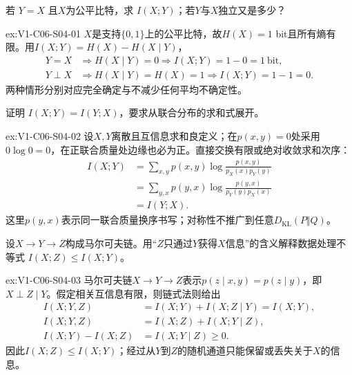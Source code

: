 \begin{SLChapterExercisePairSection}
\begin{exercise}\label{ex:V1-C06-S04-01}
若 $Y=X$ 且$X$为公平比特，求 $I(X;Y)$；若$Y$与$X$独立又是多少？
\end{exercise}
\label{sol:V1-C06-S04-01}
\begin{chapterexercisesolution}{ex:V1-C06-S04-01}
$X$是支持$\{0,1\}$上的公平比特，故$H(X)=1$ bit且所有熵有限。用$I(X;Y)=H(X)-H(X\mid Y)$，
\[
\begin{aligned}
Y=X&\Longrightarrow H(X\mid Y)=0
\Longrightarrow I(X;Y)=1-0=1\ \text{bit},\\
Y\perp X&\Longrightarrow H(X\mid Y)=H(X)=1
\Longrightarrow I(X;Y)=1-1=0.
\end{aligned}
\]
两种情形分别对应完全确定与不减少任何平均不确定性。
\end{chapterexercisesolution}

\begin{exercise}\label{ex:V1-C06-S04-02}
证明 $I(X;Y)=I(Y;X)$，要求从联合分布的求和式展开。
\end{exercise}
\label{sol:V1-C06-S04-02}
\begin{chapterexercisesolution}{ex:V1-C06-S04-02}
设$X,Y$离散且互信息求和良定义；在$p(x,y)=0$处采用$0\log0=0$，在正联合质量处边缘也必为正。直接交换有限或绝对收敛求和次序：
\[
\begin{aligned}
I(X;Y)
&=\sum_{x,y}p(x,y)
\log\frac{p(x,y)}{p_X(x)p_Y(y)}\\
&=\sum_{y,x}p(y,x)
\log\frac{p(y,x)}{p_Y(y)p_X(x)}\\
&=I(Y;X).
\end{aligned}
\]
这里$p(y,x)$表示同一联合质量换序书写；对称性不推广到任意$D_{\mathrm{KL}}(P\Vert Q)$。
\end{chapterexercisesolution}

\begin{exercise}\label{ex:V1-C06-S04-03}
设$X\to Y\to Z$构成马尔可夫链。用“$Z$只通过$Y$获得$X$信息”的含义解释数据处理不等式 $I(X;Z)\le I(X;Y)$。
\end{exercise}
\label{sol:V1-C06-S04-03}
\begin{chapterexercisesolution}{ex:V1-C06-S04-03}
马尔可夫链$X\to Y\to Z$表示$p(z\mid x,y)=p(z\mid y)$，即$X\perp Z\mid Y$。假定相关互信息有限，则链式法则给出
\[
\begin{aligned}
I(X;Y,Z)
&=I(X;Y)+I(X;Z\mid Y)=I(X;Y),\\
I(X;Y,Z)
&=I(X;Z)+I(X;Y\mid Z),\\
I(X;Y)-I(X;Z)
&=I(X;Y\mid Z)\ge0.
\end{aligned}
\]
因此$I(X;Z)\le I(X;Y)$；经过从$Y$到$Z$的随机通道只能保留或丢失关于$X$的信息。
\end{chapterexercisesolution}


\end{SLChapterExercisePairSection}
